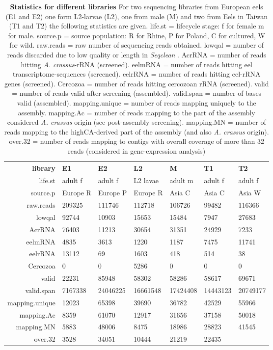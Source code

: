 \begin{table}[!h]
\begin{tabular}{rllllll}
   \hline
library & E1 & E2 & L2 & M & T1 & T2 \\ 
   \hline
life.st & adult f & adult f & L2 lavae & adult m & adult f & adult f \\ 
  source.p & Europe R & Europe P & Europe R & Asia C & Asia C & Asia W \\ 
  raw.reads & 209325 & 111746 & 112718 & 106726 & 99482 & 116366 \\ 
  lowqal & 92744 & 10903 & 15653 & 15484 & 7947 & 27683 \\ 
  AcrRNA & 76403 & 11213 & 30654 & 31351 & 24929 & 7233 \\ 
  eelmRNA & 4835 & 3613 & 1220 & 1187 & 7475 & 11741 \\ 
  eelrRNA & 13112 & 69 & 1603 & 418 & 514 & 38 \\ 
  Cercozoa & 0 & 0 & 5286 & 0 & 0 & 0 \\ 
  valid & 22231 & 85948 & 58302 & 58286 & 58617 & 69671 \\ 
  valid.span & 7167338 & 24046225 & 16661548 & 17424408 & 14443123 & 20749177 \\ 
  mapping.unique & 12023 & 65398 & 39690 & 36782 & 42529 & 55966 \\ 
  mapping.Ac &  8359 & 61070 & 12917 & 31656 & 37158 & 50018 \\ 
  mapping.MN &  5883 & 48006 &  8475 & 18986 & 28823 & 41545 \\ 
  over.32 &  3528 & 34051 & 10444 & 21219 & 22435 \\ 
  \hline
\end{tabular}
\caption[Pyro-sequencing library statistics]{\textbf{Statistics for different 
    libraries} 
  For two sequencing libraries from European eels (E1 and E2)
  one form L2-larvae (L2), one from male (M) and two from Eels in Taiwan
  (T1 and T2) the following statistics are given. life.st = lifecycle
  stage: f for female m for male. source.p = source population: R for
  Rhine, P for Poland, C for cultured, W for wild. raw.reads = raw
  number of sequencing reads obtained. lowqal = number of reads
  discarded due to low quality or length in \textit{Seqclean}
  \cite{tgicl_pertea}. AcrRNA = number of reads hitting
  \textit{A. crassus}-rRNA (screened). eelmRNA = number of reads hitting
  eel transcriptome-sequences (screened). eelrRNA = number of reads
  hitting eel-rRNA genes (screened). Cercozoa = number of reads hitting
  cercozoan rRNA (screened). valid = number of reads valid after
  screening (assembled). valid.span = number of bases valid (assembled).
  mapping.unique = number of reads mapping uniquely to the
  assembly. mapping.Ac = number of reads mapping to the part of the
  assembly considered \textit{A. crassus} origin (see post-assembly
  screening). mapping.MN = number of reads mapping to the highCA-derived
  part of the assembly (and also \textit{A. crassus} origin). over.32 =
  number of reads mapping to contigs with overall coverage of more than
  32 reads (considered in gene-expression analysis)}
  \label{screening-lib}
\end{table}

